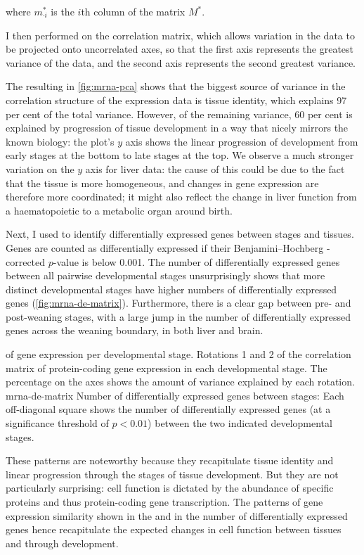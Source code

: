 where \(m_{\cdot i}^*\) is the \(i\)th column of the matrix \(M^*\).

I then performed \pca on the correlation matrix, which allows variation in the
data to be projected onto uncorrelated axes, so that the first axis represents
the greatest variance of the data, and the second axis represents the second
greatest variance.

The resulting \pca in \cref{fig:mrna-pca} shows that the biggest source of
variance in the correlation structure of the expression data is tissue identity,
which explains \num{97} per cent of the total variance. However, of the
remaining variance, \num{60} per cent is explained by progression of tissue
development in a way that nicely mirrors the known biology: the plot’s \(y\)
axis shows the linear progression of development from early stages at the bottom
to late stages at the top. We observe a much stronger variation on the \(y\)
axis for liver data: the cause of this could be due to the fact that the tissue
is more homogeneous, and changes in gene expression are therefore more
coordinated; it might also reflect the change in liver function from a
haematopoietic to a metabolic organ around birth.

Next, I used  \citep{Love:2014} to identify differentially
expressed genes between stages and tissues. Genes are counted as differentially
expressed if their Benjamini–Hochberg \fdr-corrected \(p\)-value is below
\num{0.001}. The number of differentially expressed genes between all pairwise
developmental stages unsurprisingly shows that more distinct developmental
stages have higher numbers of differentially expressed genes
(\cref{fig:mrna-de-matrix}). Furthermore, there is a clear gap between pre- and
post-weaning stages, with a large jump in the number of differentially expressed
genes across the weaning boundary, in both liver and brain.

    {\pca of \mrna gene expression per developmental stage.}
    {Rotations \num{1} and \num{2} of the correlation matrix of
    protein-coding gene expression in each developmental stage. The percentage
    on the axes shows the amount of variance explained by each rotation.}
    {mrna-de-matrix}
    {Number of differentially expressed \mrna genes between stages:}
    {Each off-diagonal square shows the number of differentially
    expressed genes (at a significance threshold of \(p<0.01\)) between
    the two indicated developmental stages.}

These patterns are noteworthy because they recapitulate tissue identity and
linear progression through the stages of tissue development. But they are not
particularly surprising: cell function is dictated by the abundance of specific
proteins and thus protein-coding gene transcription. The patterns of gene
expression similarity shown in the \pca and in the number of differentially
expressed genes hence recapitulate the expected changes in cell function between
tissues and through development.

